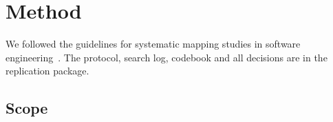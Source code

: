 \section{Method}
\label{sec:method}

 We followed the guidelines for systematic mapping studies in software engineering~\cite{petersen}. The protocol, search log, codebook and all decisions are in the replication package.

\subsection{Scope}
\label{sec:scope}

